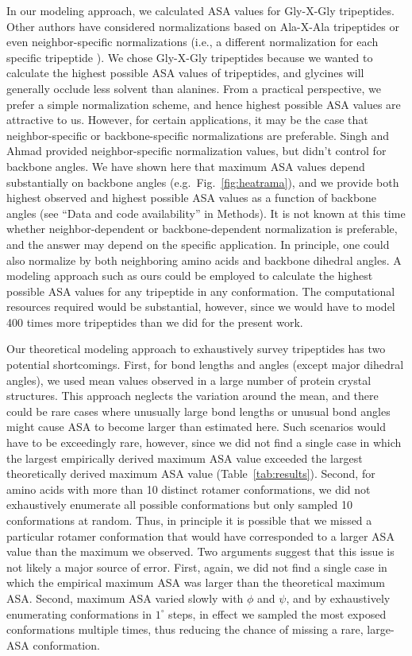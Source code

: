 \documentclass[11pt]{article}
\begin{document}
In our modeling approach, we calculated ASA values for Gly-X-Gly tripeptides. Other authors have considered normalizations based on Ala-X-Ala tripeptides \cite{Ahmadetal2003,NguyenRajapakse2005} or even neighbor-specific normalizations (i.e., a different normalization for each specific tripeptide \cite{SinghAhmad2009}). We chose Gly-X-Gly tripeptides because we wanted to calculate the highest possible ASA values of tripeptides, and glycines will generally occlude less solvent than alanines. From a practical perspective, we prefer a simple normalization scheme, and hence highest possible ASA values are attractive to us. However, for certain applications, it may be the case that neighbor-specific or backbone-specific normalizations are preferable. Singh and Ahmad \cite{SinghAhmad2009} provided neighbor-specific normalization values, but didn't control for backbone angles. We have shown here that maximum ASA values depend substantially on backbone angles (e.g.\ Fig.~\ref{fig:heatrama}), and we provide both highest observed and highest possible ASA values as a function of backbone angles (see ``Data and code availability'' in Methods). It is not known at this time whether neighbor-dependent or backbone-dependent normalization is preferable, and the answer may depend on the specific application. In principle, one could also normalize by both neighboring amino acids and backbone dihedral angles. A modeling approach such as ours could be employed to calculate the highest possible ASA values for any tripeptide in any conformation. The computational resources required would be substantial, however, since we would have to model 400 times more tripeptides than we did for the present work.

Our theoretical modeling approach to exhaustively survey tripeptides has two potential shortcomings. First, for bond lengths and angles (except major dihedral angles), we used mean values observed in a large number of protein crystal structures. This approach neglects the variation around the mean, and there could be rare cases where unusually large bond lengths or unusual bond angles might cause ASA to become larger than estimated here. Such scenarios would have to be exceedingly rare, however, since we did not find a single case in which the largest empirically derived maximum ASA value exceeded the largest theoretically derived maximum ASA value (Table~\ref{tab:results}). Second, for amino acids with more than 10 distinct rotamer conformations, we did not exhaustively enumerate all possible conformations but only sampled 10 conformations at random. Thus, in principle it is possible that we missed a particular rotamer conformation that would have corresponded to a larger ASA value than the maximum we observed. Two arguments suggest that this issue is not likely a major source of error. First, again, we did not find a single case in which the empirical maximum ASA was larger than the theoretical maximum ASA. Second, maximum ASA varied slowly with $\phi$ and $\psi$, and by exhaustively enumerating conformations in $1^\circ$ steps, in effect we sampled the most exposed conformations multiple times, thus reducing the chance of missing a rare, large-ASA conformation.
\end{document}
